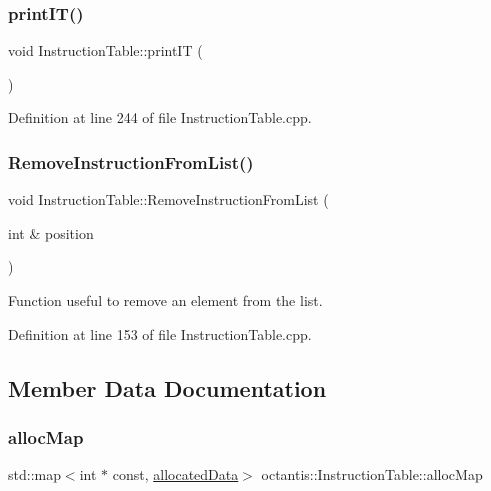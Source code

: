 \subsubsection{\texorpdfstring{print\+I\+T()}{printIT()}}
{\footnotesize\ttfamily void Instruction\+Table\+::print\+IT (\begin{DoxyParamCaption}{ }\end{DoxyParamCaption})}



Definition at line 244 of file Instruction\+Table.\+cpp.

\mbox{\label{classoctantis_1_1InstructionTable_a30b7f55d07699df52d48822ea4f886b4}} 
\subsubsection{\texorpdfstring{Remove\+Instruction\+From\+List()}{RemoveInstructionFromList()}}
{\footnotesize\ttfamily void Instruction\+Table\+::\+Remove\+Instruction\+From\+List (\begin{DoxyParamCaption}\item[{int \&}]{position }\end{DoxyParamCaption})}



Function useful to remove an element from the list. 



Definition at line 153 of file Instruction\+Table.\+cpp.



\subsection{Member Data Documentation}
\mbox{\label{classoctantis_1_1InstructionTable_a3a31a38f9f92b0ecd72c63698fe02808}} 
\subsubsection{\texorpdfstring{alloc\+Map}{allocMap}}
{\footnotesize\ttfamily std\+::map$<$int $\ast$ const, \hyperlink{structoctantis_1_1InstructionTable_1_1allocatedData}{allocated\+Data}$>$ octantis\+::\+Instruction\+Table\+::alloc\+Map}



